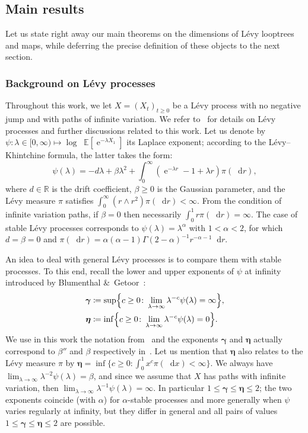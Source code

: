 \documentclass[british, a4paper,11pt]{article}
\numberwithin{equation}{section}
\theoremstyle{definition}
\newcommand{\E}{\mathop{}\!\mathbb{E}}
\newcommand{\R}{\mathbb{R}}
\newcommand{\e}{\operatorname{e}}
\renewcommand{\d}{\mathop{}\!\mathrm{d}}
\newcommand{\bdgamma}{\boldsymbol{\gamma}}
\newcommand{\bdeta}{\boldsymbol{\eta}}
\begin{document}
\subsection{Main results}
\label{ssec:intro_resultats}


Let us state right away our main theorems on the dimensions of L\'evy looptrees and maps, while deferring the precise definition of these objects to the next section.


\subsubsection*{Background on L\'evy processes}

Throughout this work, we let $X = (X_t)_{t \ge 0}$ be a L\'evy process with no negative jump and with paths of infinite variation. We refer to~\cite{Ber96, DLG02} for details on L\'evy processes and further discussions related to this work.
Let us denote by $\psi \colon \lambda \in [0, \infty) \mapsto \log \E[\e^{-\lambda X_1}]$ its Laplace exponent; according to the L\'evy--Khintchine formula, the latter takes the form:
\[\psi(\lambda) = -d \lambda + \beta \lambda^{2}+ \int_0^\infty (\e^{-\lambda r} -1 + \lambda r) \pi(\d r),\]
where $d \in \R$ is the drift coefficient, $\beta \ge 0$ is the Gaussian parameter, and the L\'evy measure $\pi$ satisfies $\int_0^\infty (r \wedge r^2) \pi(\d r) < \infty$. From the condition of infinite variation paths, 
if $\beta=0$ then necessarily $\int_0^1 r \pi(\d r) = \infty$. 
The case of stable L\'evy processes corresponds to $\psi(\lambda) = \lambda^{\alpha}$ with $1 < \alpha < 2$, for which $d=\beta=0$ and $\pi(\d r) = \alpha(\alpha-1) \Gamma(2-\alpha)^{-1} r^{-\alpha-1} \d r$.


An idea to deal with general L\'evy processes is to compare them with stable processes. To this end, recall the lower and upper exponents of $\psi$ at infinity introduced by Blumenthal \&~Getoor~\cite{BG61}:
\begin{equation}\label{eq:exposants_BG}
\begin{aligned}
\bdgamma &\coloneqq \sup\Bigl\{c \geq 0 \colon \lim_{\lambda \to \infty} \lambda^{-c} \psi(\lambda) = \infty\Bigr\},
\\
\bdeta &\coloneqq \inf\Bigl\{c \geq 0 \colon \lim_{\lambda \to \infty} \lambda^{-c} \psi(\lambda) = 0\Bigr\}.
\end{aligned}
\end{equation}
We use in this work the notation from~\cite{DLG05} and the exponents $\bdgamma$ and $\bdeta$ actually correspond to $\beta''$ and $\beta$ respectively in~\cite{BG61}. 
Let us mention that $\bdeta$ also relates to the L\'evy measure $\pi$ by $\bdeta= \inf \{c \geq 0\colon \int_{0}^{1} x^{c} \pi(\d x) <\infty\}$.
We always have $\lim_{\lambda \to \infty} \lambda^{-2} \psi(\lambda) = \beta$, and since we assume that $X$ has paths with infinite variation, then $\lim_{\lambda \to \infty} \lambda^{-1} \psi(\lambda) = \infty$. 
In particular $1 \leq \bdgamma \leq \bdeta \leq 2$; the two exponents coincide (with $\alpha$) for $\alpha$-stable processes and more generally when $\psi$ varies regularly at infinity, but they differ in general 
and all pairs of values $1 \leq \bdgamma \leq \bdeta \leq 2$ are possible.
\end{document}
